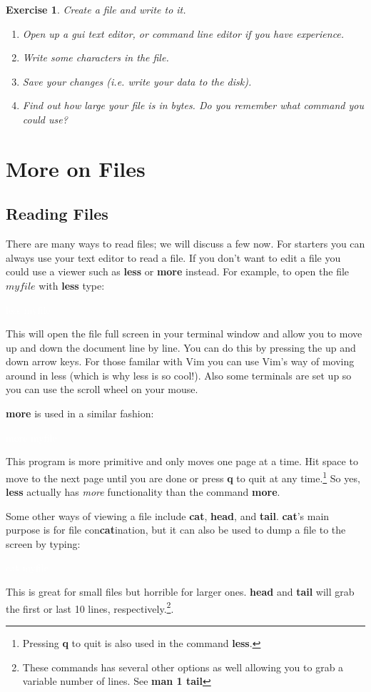 \documentclass[oneside]{book}
\newcommand{\commandline}[1]{\begin{center} \colorbox{Dark}{\textcolor{white}{#1}} \end{center}}
\newtheorem{ex}{Exercise}[chapter]
\begin{document}
\begin{ex} Create a file and write to it.
    \begin{enumerate}
        \item Open up a gui text editor, or command line editor if you have experience.
        \item Write some characters in the file.
        \item Save your changes (i.e. write your data to the disk).
        \item Find out how large your file is in bytes. Do you remember what command you could use?
    \end{enumerate}
    
\end{ex}

\section{More on Files}

\subsection{Reading Files}
	There are many ways to read files; we will discuss a few now. For starters you can always use your text editor to read a file. If you don't want to edit a file you could use a viewer such as \textbf{less} or \textbf{more} instead.
	For example, to open the file $myfile$ with \textbf{less} type:
\commandline{less myfile}
This will open the file full screen in your terminal window and allow you to move up and down the document line by line. You can do this by pressing the up and down arrow keys. For those familar with Vim you can use Vim's way of moving around in less (which is why less is so cool!). Also some terminals are set up so you can use the scroll wheel on your mouse. 


\textbf{more} is used in a similar fashion:
\commandline{more myfile}
This program is more primitive and only moves one page at a time. Hit space to move to the next page until you are done or press \textbf{q} to quit at any time.\footnote{Pressing \textbf{q} to quit is also used in the command \textbf{less}.} So yes,  \textbf{less} actually has \textit{more} functionality than the command \textbf{more}. 

Some other ways of viewing a file include \textbf{cat}, \textbf{head}, and \textbf{tail}. \textbf{cat}'s main purpose is for file con\textbf{cat}ination, but it can also be used to dump a file to the screen by typing:
\commandline{cat myfile}
This is great for small files but horrible for larger ones. \textbf{head} and \textbf{tail} will grab the first or last 10 lines, respectively.\footnote{These commands has several other options as well allowing you to grab a variable number of lines. See \textbf{man 1 tail}}.\\
\end{document}
